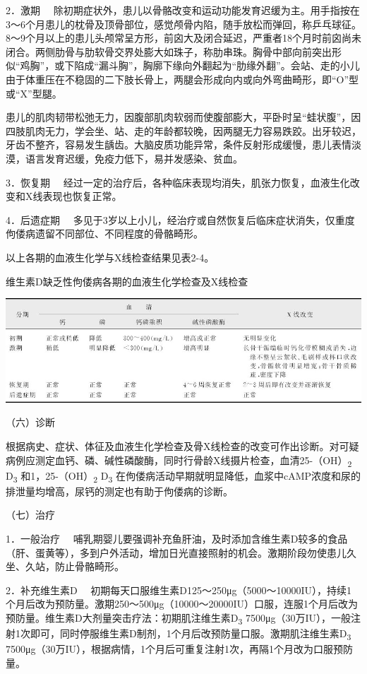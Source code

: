 {2．激期}
　除初期症状外，患儿以骨骼改变和运动功能发育迟缓为主。用手指按在3～6个月患儿的枕骨及顶骨部位，感觉颅骨内陷，随手放松而弹回，称乒乓球征。8～9个月以上的患儿头颅常呈方形，前囟大及闭合延迟，严重者18个月时前囟尚未闭合。两侧肋骨与肋软骨交界处膨大如珠子，称肋串珠。胸骨中部向前突出形似“鸡胸”，或下陷成“漏斗胸”，胸廓下缘向外翻起为“肋缘外翻”。会站、走的小儿由于体重压在不稳固的二下肢长骨上，两腿会形成向内或向外弯曲畸形，即“O”型或“X”型腿。

患儿的肌肉韧带松弛无力，因腹部肌肉软弱而使腹部膨大，平卧时呈“蛙状腹”，因四肢肌肉无力，学会坐、站、走的年龄都较晚，因两腿无力容易跌跤。出牙较迟，牙齿不整齐，容易发生龋齿。大脑皮质功能异常，条件反射形成缓慢，患儿表情淡漠，语言发育迟缓，免疫力低下，易并发感染、贫血。

{3．恢复期}
　经过一定的治疗后，各种临床表现均消失，肌张力恢复，血液生化改变和X线表现也恢复正常。

{4．后遗症期}
　多见于3岁以上小儿，经治疗或自然恢复后临床症状消失，仅重度佝偻病遗留不同部位、不同程度的骨骼畸形。

以上各期的血液生化学与X线检查结果见表2-4。

\begin{table}[htbp]
\centering
\caption{维生素D缺乏性佝偻病各期的血液生化学检查及X线检查}
\label{tab2-4}
\includegraphics{./images/Image00011.jpg}
\end{table}

（六）诊断

根据病史、症状、体征及血液生化学检查及骨X线检查的改变可作出诊断。对可疑病例应测定血钙、磷、碱性磷酸酶，同时行骨龄X线摄片检查，血清25-（OH）\textsubscript{2}
D\textsubscript{3} 和1，25-（OH）\textsubscript{2} D\textsubscript{3}
在佝偻病活动早期就明显降低，血浆中cAMP浓度和尿的排泄量均增高，尿钙的测定也有助于佝偻病的诊断。

（七）治疗

{1．一般治疗}
　哺乳期婴儿要强调补充鱼肝油，及时添加含维生素D较多的食品（肝、蛋黄等），多到户外活动，增加日光直接照射的机会。激期阶段勿使患儿久坐、久站，防止骨骼畸形。

{2．补充维生素D}
　初期每天口服维生素D125～250μg（5000～10000IU），持续1个月后改为预防量。激期250～500μg（10000～20000IU）口服，连服1个月后改为预防量。维生素D大剂量突击疗法：初期肌注维生素D\textsubscript{3}
7500μg（30万IU），一般注射1次即可，同时停服维生素D制剂，1个月后改预防量口服。激期肌注维生素D\textsubscript{3}
7500μg（30万IU），根据病情，1个月后可重复注射1次，再隔1个月改为口服预防量。

